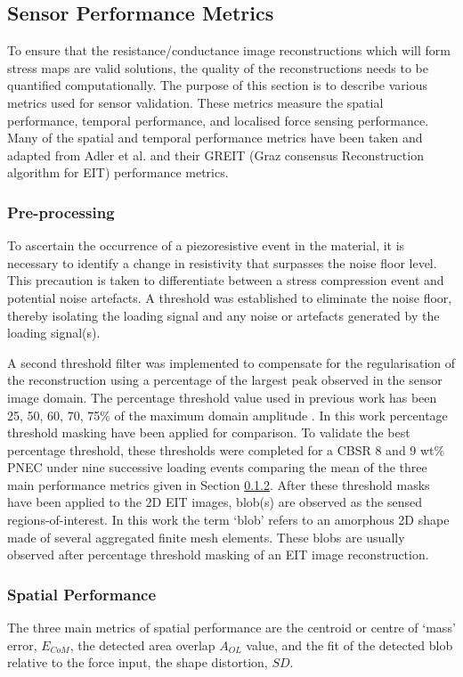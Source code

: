 \subsection{Sensor Performance Metrics}\label{sec:Sensor Performance Metrics}
To ensure that the resistance/conductance image reconstructions which will form stress maps are valid solutions, the quality of the reconstructions needs to be quantified computationally. The purpose of this section is to describe various metrics used for sensor validation. These metrics measure the spatial performance, temporal performance, and localised force sensing performance. Many of the spatial and temporal performance metrics have been taken and adapted from Adler et al. \citep{Adler2009} and their GREIT (Graz consensus Reconstruction algorithm for EIT) performance metrics.

\subsubsection{Pre-processing}\label{Pre-processing}
To ascertain the occurrence of a piezoresistive event in the material, it is necessary to identify a change in resistivity that surpasses the noise floor level. This precaution is taken to differentiate between a stress compression event and potential noise artefacts. A threshold was established to eliminate the noise floor, thereby isolating the loading signal and any noise or artefacts generated by the loading signal(s).

A second threshold filter was implemented to compensate for the regularisation of the reconstruction using a percentage of the largest peak observed in the sensor image domain. The percentage threshold value used in previous work has been 25, 50, 60, 70, 75\% of the maximum domain amplitude \citep{Adler2009,Visentin2016,Silvera-Tawil2015}. In this work percentage threshold masking have been applied for comparison. To validate the best percentage threshold, these thresholds were completed for a CBSR 8 and 9 wt\% PNEC under nine successive loading events comparing the mean of the three main performance metrics given in Section \ref{sec:Spatial Performance}. After these threshold masks have been applied to the 2D EIT images, blob(s) are observed as the sensed regions-of-interest. In this work the term `blob' refers to an amorphous 2D shape made of several aggregated finite mesh elements. These blobs are usually observed after percentage threshold masking of an EIT image reconstruction. 

\subsubsection{Spatial Performance}\label{sec:Spatial Performance}
The three main metrics of spatial performance are the centroid or centre of `mass' error, $E_{CoM}$, the detected area overlap $A_{OL}$ value, and the fit of the detected blob relative to the force input, the shape distortion, $S\!D$.

